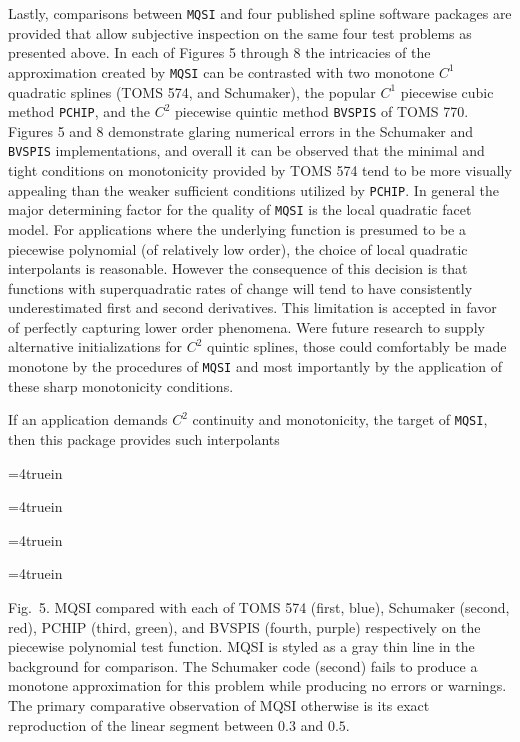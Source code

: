 \beginred

Lastly, comparisons between {\tt MQSI} and four published spline
software packages are provided that allow subjective inspection on the
same four test problems as presented above. In each of Figures 5
through 8 the intricacies of the approximation created by {\tt MQSI}
can be contrasted with two monotone $C^1$ quadratic splines (TOMS 574,
and Schumaker), the popular $C^1$ piecewise cubic method {\tt PCHIP},
and the $C^2$ piecewise quintic method {\tt BVSPIS} of TOMS
770. Figures 5 and 8 demonstrate glaring numerical errors in the
Schumaker and {\tt BVSPIS} implementations, and overall it can be
observed that the minimal and tight conditions on monotonicity
provided by TOMS 574 tend to be more visually appealing than the
weaker sufficient conditions utilized by {\tt PCHIP}. In general the
major determining factor for the quality of {\tt MQSI} is the local
quadratic facet model. For applications where the underlying function
is presumed to be a piecewise polynomial (of relatively low order),
the choice of local quadratic interpolants is reasonable. However the
consequence of this decision is that functions with superquadratic
rates of change will tend to have consistently underestimated first
and second derivatives. This limitation is accepted in favor of
perfectly capturing lower order phenomena. Were future research to
supply alternative initializations for $C^2$ quintic splines, those
could comfortably be made monotone by the procedures of {\tt MQSI} and
most importantly by the application of these sharp monotonicity
conditions.

\endred

If an application demands $C^2$ continuity and monotonicity, the
target of {\tt MQSI}, then this package  provides such
interpolants 

\goodbreak

\beginred

\topinsert
\centerline{\epsfxsize=4truein }
\centerline{\epsfxsize=4truein }
\centerline{\epsfxsize=4truein }
\centerline{\epsfxsize=4truein }
\beginred
{\narrower\noindent\rmVIII Fig.\ 5.
{\ttVIII MQSI} compared with each of TOMS 574 (first, blue), Schumaker
(second, red), {\ttVIII PCHIP} (third, green), and {\ttVIII BVSPIS}
(fourth, purple) respectively on the {\itVIII piecewise polynomial}
test function. {\ttVIII MQSI} is styled as a gray thin line in the
background for comparison. The Schumaker code (second) fails to
produce a monotone approximation for this problem while producing no
errors or warnings. The primary comparative observation of {\ttVIII
  MQSI} otherwise is its exact reproduction of the linear segment
between $0.3$ and $0.5$.
\par}
\endred
\endinsert

